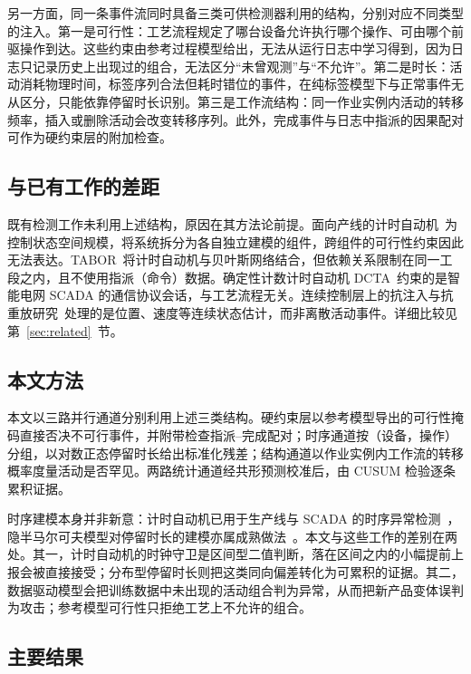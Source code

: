 \documentclass[manuscript,screen,review]{acmart}
\begin{document}
另一方面，同一条事件流同时具备三类可供检测器利用的结构，分别对应不同类型的注入。第一是可行性：工艺流程规定了哪台设备允许执行哪个操作、可由哪个前驱操作到达。这些约束由参考过程模型给出，无法从运行日志中学习得到，因为日志只记录历史上出现过的组合，无法区分``未曾观测''与``不允许''。第二是时长：活动消耗物理时间，标签序列合法但耗时错位的事件，在纯标签模型下与正常事件无从区分，只能依靠停留时长识别。第三是工作流结构：同一作业实例内活动的转移频率，插入或删除活动会改变转移序列。此外，完成事件与日志中指派的因果配对可作为硬约束层的附加检查。

\subsection{与已有工作的差距}
\label{sec:intro_gap}

既有检测工作未利用上述结构，原因在其方法论前提。面向产线的计时自动机~\cite{maier2011timed}为控制状态空间规模，将系统拆分为各自独立建模的组件，跨组件的可行性约束因此无法表达。TABOR~\cite{lin2018tabor}将计时自动机与贝叶斯网络结合，但依赖关系限制在同一工段之内，且不使用指派（命令）数据。确定性计数计时自动机 DCTA~\cite{barsha2024dcta}约束的是智能电网 {SCADA} 的通信协议会话，与工艺流程无关。连续控制层上的抗注入与抗重放研究~\cite{elsisi2023agv,mo2009replay}处理的是位置、速度等连续状态估计，而非离散活动事件。详细比较见第~\ref{sec:related}~节。

\subsection{本文方法}
\label{sec:intro_method}

本文以三路并行通道分别利用上述三类结构。硬约束层以参考模型导出的可行性掩码直接否决不可行事件，并附带检查指派--完成配对；时序通道按（设备，操作）分组，以对数正态停留时长给出标准化残差；结构通道以作业实例内工作流的转移概率度量活动是否罕见。两路统计通道经共形预测校准后，由 {CUSUM} 检验逐条累积证据。

时序建模本身并非新意：计时自动机已用于生产线与 {SCADA} 的时序异常检测~\cite{maier2011timed,lin2018timing}，隐半马尔可夫模型对停留时长的建模亦属成熟做法~\cite{tan2008hsmm}。本文与这些工作的差别在两处。其一，计时自动机的时钟守卫是区间型二值判断，落在区间之内的小幅提前上报会被直接接受；分布型停留时长则把这类同向偏差转化为可累积的证据。其二，数据驱动模型会把训练数据中未出现的活动组合判为异常，从而把新产品变体误判为攻击；参考模型可行性只拒绝工艺上不允许的组合。

\subsection{主要结果}
\label{sec:intro_results}
\end{document}
